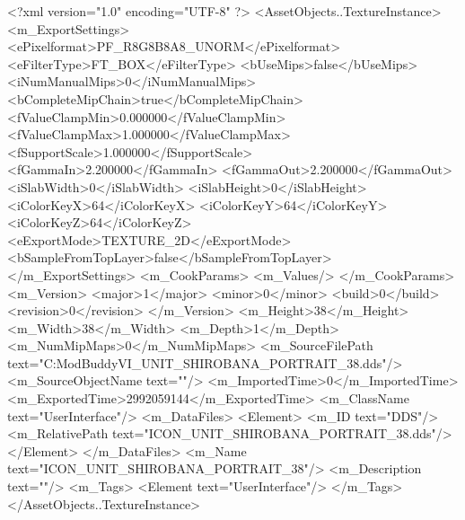 <?xml version="1.0" encoding="UTF-8" ?>
<AssetObjects..TextureInstance>
	<m_ExportSettings>
		<ePixelformat>PF_R8G8B8A8_UNORM</ePixelformat>
		<eFilterType>FT_BOX</eFilterType>
		<bUseMips>false</bUseMips>
		<iNumManualMips>0</iNumManualMips>
		<bCompleteMipChain>true</bCompleteMipChain>
		<fValueClampMin>0.000000</fValueClampMin>
		<fValueClampMax>1.000000</fValueClampMax>
		<fSupportScale>1.000000</fSupportScale>
		<fGammaIn>2.200000</fGammaIn>
		<fGammaOut>2.200000</fGammaOut>
		<iSlabWidth>0</iSlabWidth>
		<iSlabHeight>0</iSlabHeight>
		<iColorKeyX>64</iColorKeyX>
		<iColorKeyY>64</iColorKeyY>
		<iColorKeyZ>64</iColorKeyZ>
		<eExportMode>TEXTURE_2D</eExportMode>
		<bSampleFromTopLayer>false</bSampleFromTopLayer>
	</m_ExportSettings>
	<m_CookParams>
		<m_Values/>
	</m_CookParams>
	<m_Version>
		<major>1</major>
		<minor>0</minor>
		<build>0</build>
		<revision>0</revision>
	</m_Version>
	<m_Height>38</m_Height>
	<m_Width>38</m_Width>
	<m_Depth>1</m_Depth>
	<m_NumMipMaps>0</m_NumMipMaps>
	<m_SourceFilePath text="C:\Users\asus\Documents\Firaxis ModBuddy\Civilization VI\temppic\ICON_UNIT_SHIROBANA_PORTRAIT_38.dds"/>
	<m_SourceObjectName text=""/>
	<m_ImportedTime>0</m_ImportedTime>
	<m_ExportedTime>2992059144</m_ExportedTime>
	<m_ClassName text="UserInterface"/>
	<m_DataFiles>
		<Element>
			<m_ID text="DDS"/>
			<m_RelativePath text="ICON_UNIT_SHIROBANA_PORTRAIT_38.dds"/>
		</Element>
	</m_DataFiles>
	<m_Name text="ICON_UNIT_SHIROBANA_PORTRAIT_38"/>
	<m_Description text=""/>
	<m_Tags>
		<Element text="UserInterface"/>
	</m_Tags>
</AssetObjects..TextureInstance>

